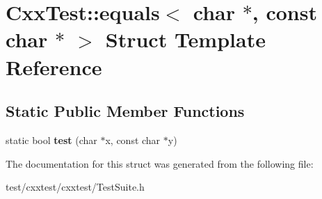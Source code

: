 \hypertarget{structCxxTest_1_1equals_3_01char_01_5_00_01const_01char_01_5_01_4}{\section{Cxx\-Test\-:\-:equals$<$ char $\ast$, const char $\ast$ $>$ Struct Template Reference}
\label{structCxxTest_1_1equals_3_01char_01_5_00_01const_01char_01_5_01_4}
}
\subsection*{Static Public Member Functions}
\begin{DoxyCompactItemize}
\item 
\hypertarget{structCxxTest_1_1equals_3_01char_01_5_00_01const_01char_01_5_01_4_a8977abbec5e6efaf1882b954fa35dfa1}{static bool {\bfseries test} (char $\ast$x, const char $\ast$y)}\label{structCxxTest_1_1equals_3_01char_01_5_00_01const_01char_01_5_01_4_a8977abbec5e6efaf1882b954fa35dfa1}

\end{DoxyCompactItemize}


The documentation for this struct was generated from the following file\-:\begin{DoxyCompactItemize}
\item 
test/cxxtest/cxxtest/Test\-Suite.\-h\end{DoxyCompactItemize}
